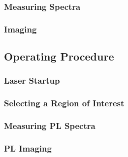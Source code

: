 \subsubsection{Measuring Spectra}
\subsubsection{Imaging}

\subsection{Operating Procedure}
\subsubsection{Laser Startup} %
\subsubsection{Selecting a Region of Interest}
\subsubsection{Measuring PL Spectra}
\subsubsection{PL Imaging}